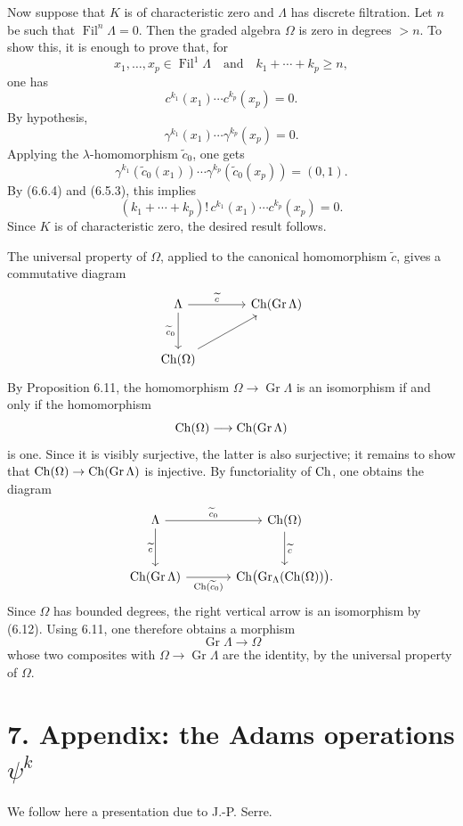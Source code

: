 \documentclass[11pt]{article}
\newcommand{\Gr}{\operatorname{Gr}}
\newcommand{\Fil}{\operatorname{Fil}}
\providecommand{\Gr}{\operatorname{Gr}}
\providecommand{\Gr}{\operatorname{G}}
\begin{document}
Now suppose that \(K\) is of characteristic zero and \(\Lambda\) has discrete filtration. Let \(n\) be such that \(\Fil^n\Lambda=0\). Then the graded algebra \(\Omega\) is zero in degrees \(>n\). To show this, it is enough to prove that, for
\[
  x_1,\ldots,x_p\in\Fil^1\Lambda
  \quad\text{and}\quad
  k_1+\cdots+k_p\ge n,
\]
one has
\[
  c^{k_1}(x_1)\cdots c^{k_p}(x_p)=0.
\]
By hypothesis,
\[
  \gamma^{k_1}(x_1)\cdots\gamma^{k_p}(x_p)=0.
\]
Applying the \(\lambda\)-homomorphism \(\widetilde c_0\), one gets
\[
  \gamma^{k_1}(\widetilde c_0(x_1))\cdots
  \gamma^{k_p}(\widetilde c_0(x_p))=(0,1).
\]
By (6.6.4) and (6.5.3), this implies
\[
  (k_1+\cdots+k_p)!\,
  c^{k_1}(x_1)\cdots c^{k_p}(x_p)=0.
\]
Since \(K\) is of characteristic zero, the desired result follows.

The universal property of \(\Omega\), applied to the canonical homomorphism \(\widetilde c\), gives a commutative diagram
\[
\begin{tikzcd}[column sep=large,row sep=large]
\Lambda \arrow[r,"\widetilde c"] \arrow[d,"\widetilde c_0"'] &
\Ch(\Gr\Lambda)\\
\Ch(\Omega) \arrow[ur] &
\end{tikzcd}
\]
By Proposition 6.11, the homomorphism \(\Omega\to\Gr\Lambda\) is an isomorphism if and only if the homomorphism
\[
  \Ch(\Omega)\longrightarrow \Ch(\Gr\Lambda)
\]
is one. Since it is visibly surjective, the latter is also surjective; it remains to show that
\(\Ch(\Omega)\to\Ch(\Gr\Lambda)\) is injective. By functoriality of \(\operatorname{Ch}\), one obtains the diagram
\[
\begin{tikzcd}[column sep=large,row sep=large]
\Lambda \arrow[r,"\widetilde c_0"] \arrow[d,"\widetilde c"'] &
\Ch(\Omega) \arrow[d,"\widetilde c"]\\
\Ch(\Gr\Lambda) \arrow[r,"\Ch(\widetilde c_0)"'] &
\Ch\bigl(\Gr_\Lambda(\Ch(\Omega))\bigr).
\end{tikzcd}
\]
Since \(\Omega\) has bounded degrees, the right vertical arrow is an isomorphism by (6.12). Using 6.11, one therefore obtains a morphism
\[
  \Gr\Lambda\longrightarrow\Omega
\]
whose two composites with \(\Omega\to\Gr\Lambda\) are the identity, by the universal property of \(\Omega\).

\section*{7. Appendix: the Adams operations \(\psi^k\)}

We follow here a presentation due to J.-P. Serre.
\end{document}
